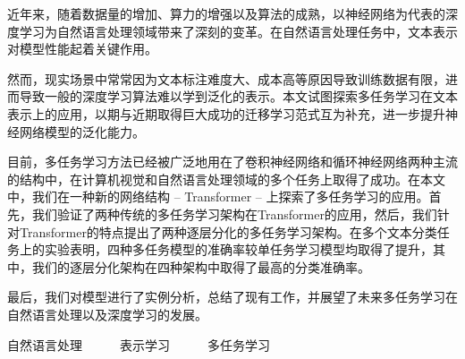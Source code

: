 \begin{cabstract}
	近年来，随着数据量的增加、算力的增强以及算法的成熟，以神经网络为代表的深度学习为自然语言处理领域带来了深刻的变革。在自然语言处理任务中，文本表示对模型性能起着关键作用。
	
	然而，现实场景中常常因为文本标注难度大、成本高等原因导致训练数据有限，进而导致一般的深度学习算法难以学到泛化的表示。本文试图探索多任务学习在文本表示上的应用，以期与近期取得巨大成功的迁移学习范式互为补充，进一步提升神经网络模型的泛化能力。
	
	目前，多任务学习方法已经被广泛地用在了卷积神经网络和循环神经网络两种主流的结构中，在计算机视觉和自然语言处理领域的多个任务上取得了成功。在本文中，我们在一种新的网络结构 -- Transformer -- 上探索了多任务学习的应用。首先，我们验证了两种传统的多任务学习架构在Transformer的应用，然后，我们针对Transformer的特点提出了两种逐层分化的多任务学习架构。在多个文本分类任务上的实验表明，四种多任务模型的准确率较单任务学习模型均取得了提升，其中，我们的逐层分化架构在四种架构中取得了最高的分类准确率。
	
	最后，我们对模型进行了实例分析，总结了现有工作，并展望了未来多任务学习在自然语言处理以及深度学习的发展。
\end{cabstract}


\begin{ckeywords}
	自然语言处理\ \ \ \ \ \ 表示学习\ \ \ \ \ \ 多任务学习
\end{ckeywords}



